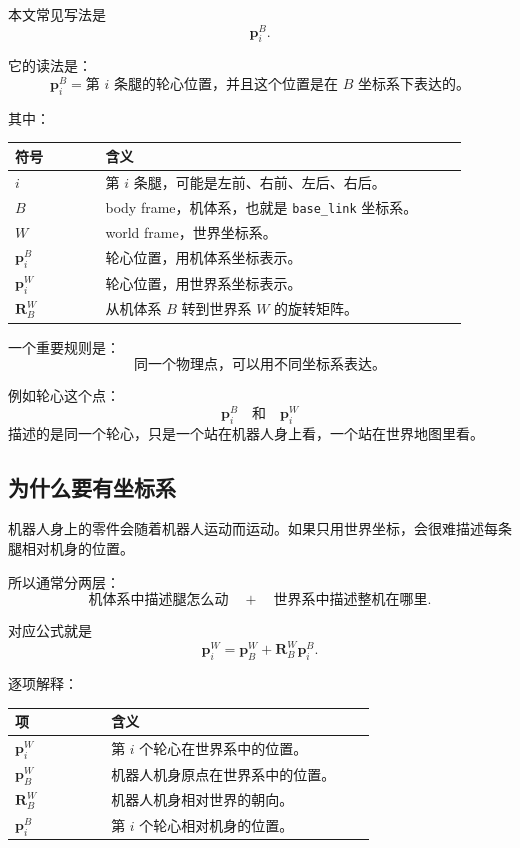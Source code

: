 \documentclass[UTF8,11pt,a4paper]{ctexart}
\newcommand{\bs}[1]{\bm{#1}}
\begin{document}
本文常见写法是
\[
\bs p_i^B.
\]

它的读法是：
\[
\bs p_i^B
=
\text{第 } i \text{ 条腿的轮心位置，并且这个位置是在 } B \text{ 坐标系下表达的。}
\]

其中：

\begin{center}
\begin{tabular}{p{0.18\linewidth}p{0.72\linewidth}}
\toprule
符号 & 含义 \\
\midrule
\(i\) & 第 \(i\) 条腿，可能是左前、右前、左后、右后。\\
\(B\) & body frame，机体系，也就是 \texttt{base\_link} 坐标系。\\
\(W\) & world frame，世界坐标系。\\
\(\bs p_i^B\) & 轮心位置，用机体系坐标表示。\\
\(\bs p_i^W\) & 轮心位置，用世界系坐标表示。\\
\(\bs R_B^W\) & 从机体系 \(B\) 转到世界系 \(W\) 的旋转矩阵。\\
\bottomrule
\end{tabular}
\end{center}

一个重要规则是：
\[
\text{同一个物理点，可以用不同坐标系表达。}
\]

例如轮心这个点：
\[
\bs p_i^B
\quad\text{和}\quad
\bs p_i^W
\]
描述的是同一个轮心，只是一个站在机器人身上看，一个站在世界地图里看。

\subsection{为什么要有坐标系}

机器人身上的零件会随着机器人运动而运动。如果只用世界坐标，会很难描述每条腿相对机身的位置。

所以通常分两层：
\[
\text{机体系中描述腿怎么动}
\quad+\quad
\text{世界系中描述整机在哪里}.
\]

对应公式就是
\[
\bs p_i^W
=
\bs p_B^W+\bs R_B^W\bs p_i^B.
\]

逐项解释：

\begin{center}
\begin{tabular}{p{0.24\linewidth}p{0.66\linewidth}}
\toprule
项 & 含义 \\
\midrule
\(\bs p_i^W\) & 第 \(i\) 个轮心在世界系中的位置。\\
\(\bs p_B^W\) & 机器人机身原点在世界系中的位置。\\
\(\bs R_B^W\) & 机器人机身相对世界的朝向。\\
\(\bs p_i^B\) & 第 \(i\) 个轮心相对机身的位置。\\
\bottomrule
\end{tabular}
\end{center}
\end{document}
